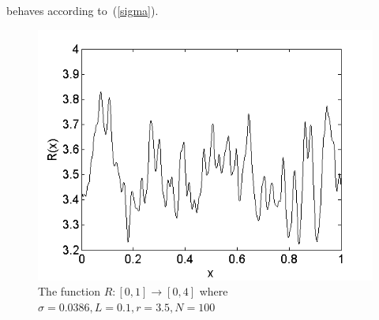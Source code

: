 behaves according to~(\ref{sigma}).
\begin{figure}[!h]
\caption[The function $R(x)$]{The function $R:[0,1]\to [0,4]$ where
  $\sigma=0.0386, L=0.1, r=3.5, N=100$}\label{fig:R}
	\begin{center}
		\includegraphics[scale=0.65]{figs/xi.png}
	\end{center}
\end{figure}


